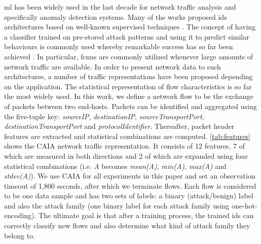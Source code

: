 \documentclass[conference]{IEEEtran}
\begin{document}
\gls{ml} has been widely used in the last decade for network traffic analysis and specifically anomaly detection systems. Many of the works proposed \gls{ids} architectures based on well-known supervised techniques \cite{buczak_survey_2016,berman_survey_2019}. The concept of having a classifier trained on pre-stored attack patterns and using it to predict similar behaviours is commonly used whereby remarkable success has so far been achieved \cite{vigneswaran_evaluating_2018,ferrag_deep_2020,almseidin_evaluation_2017}. In particular, \glspl{fcnn} are commonly utilized whenever large amounts of network traffic are available. In order to present network data to such architectures, a number of traffic representations have been proposed depending on the application. The statistical representation of flow characteristics is so far the most widely used. In this work, we define a network flow to be the exchange of packets between two end-hosts. Packets can be identified and aggregated using the five-tuple key: \emph{sourceIP}, \emph{destinationIP}, \emph{sourceTransportPort}, \emph{destinationTransportPort} and \emph{protocolIdentifier}. Thereafter, packet header features are extracted and statistical combinations are computed. \autoref{tab:features} shows the CAIA \cite{williams_preliminary_2006} network traffic representation. It consists of 12 features, 7 of which are measured in both directions and 2 of which are expanded using four statistical combinations (i.e. \emph{A} becomes \emph{mean(A)}, \emph{min(A)}, \emph{max(A)} and \emph{stdev(A)}). We use CAIA for all experiments in this paper and set an observation timeout of 1,800 seconds, after which we terminate flows. Each flow is considered to be one data sample and has two sets of labels: a binary (attack/benign) label and also the attack family (one binary label for each attack family using one-hot-encoding). The ultimate goal is that after a training process, the trained \gls{ids} can correctly classify new flows and also determine what kind of attack family they belong to.
\end{document}
